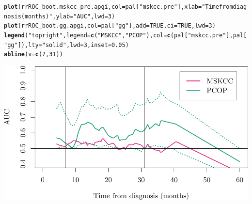 \documentclass{article}\usepackage[]{graphicx}\usepackage[]{color}
\makeatletter
\def\maxwidth{ %
  \ifdim\Gin@nat@width>\linewidth
    \linewidth
  \else
    \Gin@nat@width
  \fi
}
\newcommand{\hlnum}[1]{\textcolor[rgb]{0.686,0.059,0.569}{#1}}%
\newcommand{\hlstr}[1]{\textcolor[rgb]{0.192,0.494,0.8}{#1}}%
\newcommand{\hlstd}[1]{\textcolor[rgb]{0.345,0.345,0.345}{#1}}%
\newcommand{\hlkwc}[1]{\textcolor[rgb]{0.333,0.667,0.333}{#1}}%
\newcommand{\hlkwd}[1]{\textcolor[rgb]{0.737,0.353,0.396}{\textbf{#1}}}%
\newenvironment{kframe}{%
 \def\at@end@of@kframe{}%
 \ifinner\ifhmode%
  \def\at@end@of@kframe{\end{minipage}}%
  \begin{minipage}{\columnwidth}%
 \fi\fi%
 \def\FrameCommand##1{\hskip\@totalleftmargin \hskip-\fboxsep
 \colorbox{shadecolor}{##1}\hskip-\fboxsep
     \hskip-\linewidth \hskip-\@totalleftmargin \hskip\columnwidth}%
 \MakeFramed {\advance\hsize-\width
   \@totalleftmargin\z@ \linewidth\hsize
   \@setminipage}}%
 {\par\unskip\endMakeFramed%
 \at@end@of@kframe}
\newenvironment{knitrout}{}{} %
\makeatother
\begin{document}
\begin{knitrout}
\color{fgcolor}\begin{kframe}
\begin{alltt}
\hlkwd{plot}\hlstd{(rrROC_boot.mskcc_pre.apgi,} \hlkwc{col} \hlstd{= pal[}\hlstr{"mskcc.pre"}\hlstd{],} \hlkwc{xlab} \hlstd{=} \hlstr{"Time from diagnosis (months)"}\hlstd{,} \hlkwc{ylab} \hlstd{=} \hlstr{"AUC"}\hlstd{,} \hlkwc{lwd} \hlstd{=} \hlnum{3}\hlstd{)}
\hlkwd{plot}\hlstd{(rrROC_boot.gg.apgi,} \hlkwc{col} \hlstd{= pal[}\hlstr{"gg"}\hlstd{],} \hlkwc{add} \hlstd{=} \hlnum{TRUE}\hlstd{,} \hlkwc{ci} \hlstd{=} \hlnum{TRUE}\hlstd{,} \hlkwc{lwd} \hlstd{=} \hlnum{3}\hlstd{)}
\hlkwd{legend}\hlstd{(}\hlstr{"topright"}\hlstd{,} \hlkwc{legend} \hlstd{=} \hlkwd{c}\hlstd{(}\hlstr{"MSKCC"}\hlstd{,} \hlstr{"PCOP"}\hlstd{),} \hlkwc{col} \hlstd{=} \hlkwd{c}\hlstd{(pal[}\hlstr{"mskcc.pre"}\hlstd{], pal[}\hlstr{"gg"}\hlstd{]),} \hlkwc{lty} \hlstd{=} \hlstr{"solid"}\hlstd{,} \hlkwc{lwd} \hlstd{=} \hlnum{3}\hlstd{,} \hlkwc{inset} \hlstd{=} \hlnum{0.05}\hlstd{)}
\hlkwd{abline}\hlstd{(}\hlkwc{v} \hlstd{=} \hlkwd{c}\hlstd{(}\hlnum{7}\hlstd{,} \hlnum{31}\hlstd{))}
\end{alltt}
\end{kframe}

{\centering \includegraphics[width=\maxwidth]{figure/07-risksetROC-plot-apgi-1} 

}



\end{knitrout}
\end{document}
